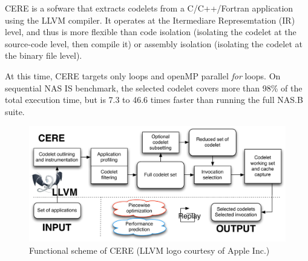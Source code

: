 \documentclass{article}
\begin{document}
\begin{multicols}{2}
CERE is a sofware that extracts codelets from a C/C++/Fortran application using the LLVM compiler. It operates at the Itermediare Represemtation (IR) level, and thus is more flexible than code isolation (isolating the codelet at the source-code level, then compile it) or assembly isolation (isolating the codelet at the binary file level)\cite{CERE}. 


At this time, CERE targets only loops and openMP parallel \textit{for} loops. On sequential NAS IS benchmark, the selected codelet covers more than 98\% of the total execution time, but is 7.3 to 46.6 times faster than running the full NAS.B suite.


\end{multicols}
\begin{figure}[ht]
\begin{center}
\includegraphics[width=0.85\linewidth]{cere_fonction.pdf}
\caption{\label{CERE_schema}Functional scheme of CERE (LLVM logo courtesy of Apple Inc.)}
\end{center}
\end{figure}

\newpage
\end{document}
